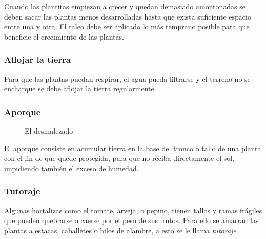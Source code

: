 \documentclass[../main.tex]{subfiles}
\begin{document}
Cuando las plantitas empiezan a crecer y quedan demasiado amontonadas se deben sacar las plantas menos desarrolladas hasta que exista suficiente espacio entre una y otra. El raleo debe ser aplicado lo más temprano posible para que beneficie el crecimiento de las plantas.

\subsubsection{Aflojar la tierra}

Para que las plantas puedan respirar, el agua pueda filtrarse y el terreno no se encharque se debe aflojar la tierra regularmente.


\subsubsection{\hfill{Aporque}}


\begin{wrapfigure}[19]{o}[0cm]{0.45\textwidth}
    \centering
    \caption*{\color{CompostGreen!50!black}El desmalezado}
    \label{desyerbar1}
\end{wrapfigure}

El aporque consiste en acumular tierra en la base del tronco o tallo de una planta con el fin de que quede protegida, para que no reciba directamente el sol, impidiendo también el exceso de humedad.


\subsubsection{Tutoraje}

Algunas hortalizas como el tomate, arveja, o pepino, tienen tallos y ramas frágiles que pueden quebrarse o caerse por el peso de sus frutos. Para ello se amarran las plantas a estacas, caballetes o hilos de alambre, a esto se le llama \emph{tutoraje}.

\subsection{}
\end{document}
